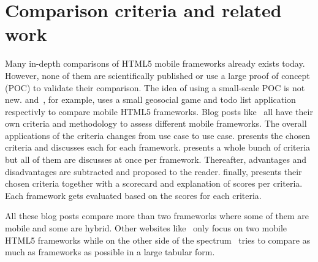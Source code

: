 \documentclass[a4paper]{artikel3}
\begin{document}
\section{Comparison criteria and related work}
\label{sec:comparisoncriteria}


Many in-depth comparisons of HTML5 mobile frameworks already exists today.  
However, none of them are scientifically published or use a large proof of concept (POC) to validate their comparison.  
The idea of using a small-scale POC is not new.  
\cite{Oeflman2011} and~\cite{Kosmaczewski2012},  for example,  uses a small geosocial game and todo list application respectivly to compare mobile HTML5 frameworks.
Blog posts like~\cite{Sarrafi2012a,Ayuso2012,Rozynski2011} all have their own criteria and methodology to assess different mobile frameworks.  
The overall applications of the criteria changes from use case to use case.  
\cite{Rozynski2011} presents the chosen criteria and discusses each for each framework.  
\cite{Ayuso2012} presents a whole bunch of criteria but all of them are discusses at once per framework.  
Thereafter,  advantages and disadvantages are subtracted and proposed to the reader.  
\cite{Sarrafi2012a} finally,  presents their chosen criteria together with a scorecard and explanation of scores per criteria.  
Each framework gets evaluated based on the scores for each criteria.

All these blog posts compare more than two frameworks where some of them are mobile and some are hybrid.  
Other websites like~\cite{Bristowe2012,Burris} only focus on two mobile HTML5 frameworks while on the other side of the spectrum~\cite{Falk2011} tries to compare as much as frameworks as possible in a large tabular form.

\end{document}
